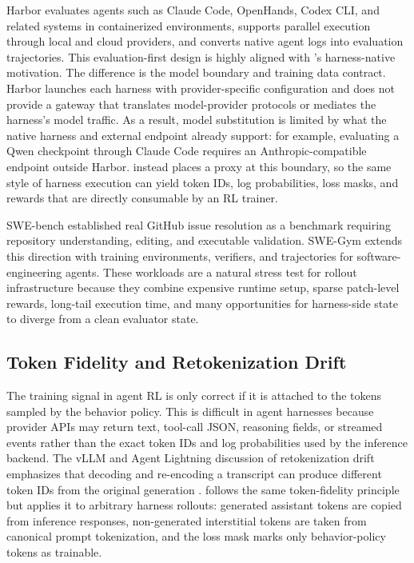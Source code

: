 Harbor \citep{harbor2026} evaluates agents such as Claude Code, OpenHands, Codex CLI, and related systems in containerized environments, supports parallel execution through local and cloud providers, and converts native agent logs into evaluation trajectories. This evaluation-first design is highly aligned with \polar's harness-native motivation. The difference is the model boundary and training data contract. Harbor launches each harness with provider-specific configuration and does not provide a gateway that translates model-provider protocols or mediates the harness's model traffic. As a result, model substitution is limited by what the native harness and external endpoint already support: for example, evaluating a Qwen checkpoint through Claude Code requires an Anthropic-compatible endpoint outside Harbor. \polar instead places a proxy at this boundary, so the same style of harness execution can yield token IDs, log probabilities, loss masks, and rewards that are directly consumable by an RL trainer.

SWE-bench \citep{swebench2024} established real GitHub issue resolution as a benchmark requiring repository understanding, editing, and executable validation. SWE-Gym \citep{swegym2024} extends this direction with training environments, verifiers, and trajectories for software-engineering agents. These workloads are a natural stress test for rollout infrastructure because they combine expensive runtime setup, sparse patch-level rewards, long-tail execution time, and many opportunities for harness-side state to diverge from a clean evaluator state.

\subsection{Token Fidelity and Retokenization Drift}

The training signal in agent RL is only correct if it is attached to the tokens sampled by the behavior policy. This is difficult in agent harnesses because provider APIs may return text, tool-call JSON, reasoning fields, or streamed events rather than the exact token IDs and log probabilities used by the inference backend. The vLLM and Agent Lightning discussion of retokenization drift emphasizes that decoding and re-encoding a transcript can produce different token IDs from the original generation \citep{vllmretokenization2025}. \polar follows the same token-fidelity principle but applies it to arbitrary harness rollouts: generated assistant tokens are copied from inference responses, non-generated interstitial tokens are taken from canonical prompt tokenization, and the loss mask marks only behavior-policy tokens as trainable.
